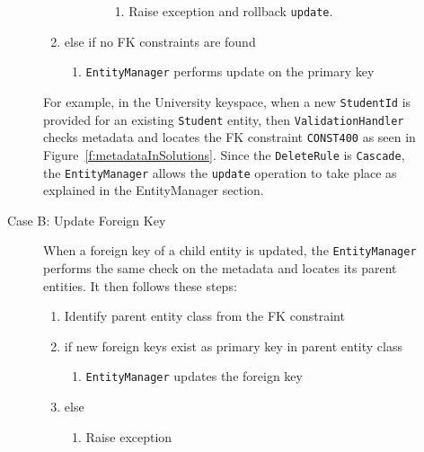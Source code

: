 \begin{description}
\begin{description}
\begin{enumerate}
\begin{enumerate}
\begin{enumerate}
\begin{enumerate}
				    	\item Raise exception and rollback \texttt{update}. 
				    	\end{enumerate}
				\end{enumerate}
			\end{enumerate}
		  \item else if no \ac{FK} constraints are found 
		  		\begin{enumerate}
		  		  \item \texttt{EntityManager}
		  performs update on the primary key
				\end{enumerate}
		 \end{enumerate}
		 
		For example,  in the University keyspace,  when a
		new \texttt{StudentId} is provided for an existing  \texttt{Student}
		entity,  then \texttt{ValidationHandler}
		checks metadata and locates the \ac{FK} constraint \texttt{CONST400} as seen in
		Figure~\ref{f:metadataInSolutions}. Since the \texttt{DeleteRule} is
		\texttt{Cascade}, the \texttt{EntityManager} allows the \texttt{update}
		operation to take place as explained in the EntityManager section.
			
		 
		\item[Case B: Update Foreign Key] When a foreign key of a child entity is
		updated, the  \texttt{EntityManager} performs the same check on the
		metadata and locates its parent entities. It then follows these steps:
		\begin{enumerate}
		  \item Identify parent entity class from the \ac{FK} constraint
		  \item if new foreign keys exist as primary key in parent entity class
			\begin{enumerate}
				\item \texttt{EntityManager} updates  the foreign key
			\end{enumerate}
		  \item else 
			\begin{enumerate}
				\item Raise exception
			\end{enumerate}
		\end{enumerate}


\end{description}
\end{description}
